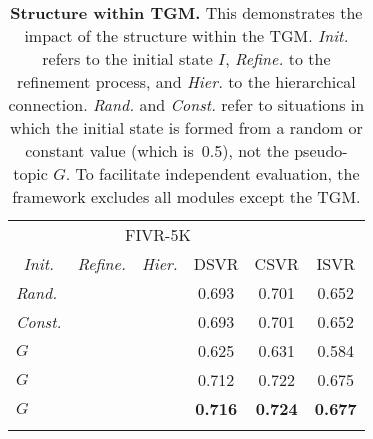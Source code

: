 \documentclass[10pt,twocolumn,letterpaper]{article}
\newcommand{\cmark}{\ding{51}}
\begin{document}
    \begin{table}[!t]
    \footnotesize
    \centering
    \begin{tabular}{ccc|ccc}
        \cmidrule[\heavyrulewidth]{1-6}
        \morecmidrules
        \cmidrule[\heavyrulewidth]{1-6} 
        \multicolumn{3}{c|}{TGM}                        & \multicolumn{3}{c}{FIVR-5K} \\ \cmidrule(){1-6}
        \textit{Init.} & \textit{Refine.} & \textit{Hier.} & DSVR    & CSVR    & ISVR    \\ \midrule
        \multicolumn{1}{l}{\textit{Rand.}}       & \cmark               & \cmark   & 0.693   & 0.701   & 0.652   \\
        \multicolumn{1}{l}{\textit{Const.}}      & \cmark               & \cmark   & 0.693   & 0.701   & 0.652   \\ \midrule
        \multicolumn{1}{l}{$G$}                  &                      &          & 0.625   & 0.631   & 0.584   \\
        \multicolumn{1}{l}{$G$}                  & \cmark               &          & 0.712   & 0.722   & 0.675   \\
        \multicolumn{1}{l}{$G$}                  & \cmark               & \cmark   & \textbf{0.716} & \textbf{0.724} & \textbf{0.677}   \\
        \cmidrule[\heavyrulewidth]{1-6}
        \morecmidrules
        \cmidrule[\heavyrulewidth]{1-6} 
    \end{tabular}
    \vspace{-4mm}
    \caption{\textbf{Structure within TGM.} This demonstrates the impact of the structure within the TGM. \textit{Init.} refers to the initial state $I$, \textit{Refine.} to the refinement process, and \textit{Hier.} to the hierarchical connection. \textit{Rand.} and \textit{Const.} refer to situations in which the initial state is formed from a random or constant value (which is~0.5), not the pseudo-topic $G$. To facilitate independent evaluation, the framework excludes all modules except the TGM. \vspace{-4mm}}
    \label{tab:compo_ablation_tgm}
    \end{table}
        \vspace{-0mm}
        
\end{document}
